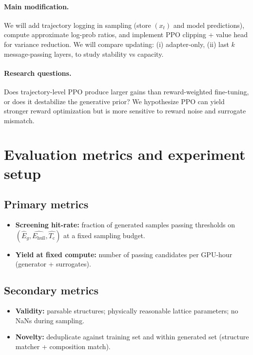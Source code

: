 \documentclass{article}
\newcommand{\Tc}{T_{\mathrm{c}}}
\newcommand{\Ehull}{E_{\mathrm{hull}}}
\begin{document}
\paragraph{Main modification.}
We will add trajectory logging in sampling (store $(x_t)$ and model predictions), compute approximate log-prob ratios, and implement PPO clipping + value head for variance reduction.
We will compare updating: (i) adapter-only, (ii) last $k$ message-passing layers, to study stability vs capacity.

\paragraph{Research questions.}
Does trajectory-level PPO produce larger gains than reward-weighted fine-tuning, or does it destabilize the generative prior?
We hypothesize PPO can yield stronger reward optimization but is more sensitive to reward noise and surrogate mismatch.

\section{Evaluation metrics and experiment setup}
\subsection{Primary metrics}
\begin{itemize}
    \item \textbf{Screening hit-rate:} fraction of generated samples passing thresholds on $(\widehat{E}_g, \widehat{\Ehull}, \widehat{\Tc})$ at a fixed sampling budget.
    \item \textbf{Yield at fixed compute:} number of passing candidates per GPU-hour (generator + surrogates).
\end{itemize}

\subsection{Secondary metrics}
\begin{itemize}
    \item \textbf{Validity:} parsable structures; physically reasonable lattice parameters; no NaNs during sampling.
    \item \textbf{Novelty:} deduplicate against training set and within generated set (structure matcher + composition match).
\end{itemize}
\end{document}
